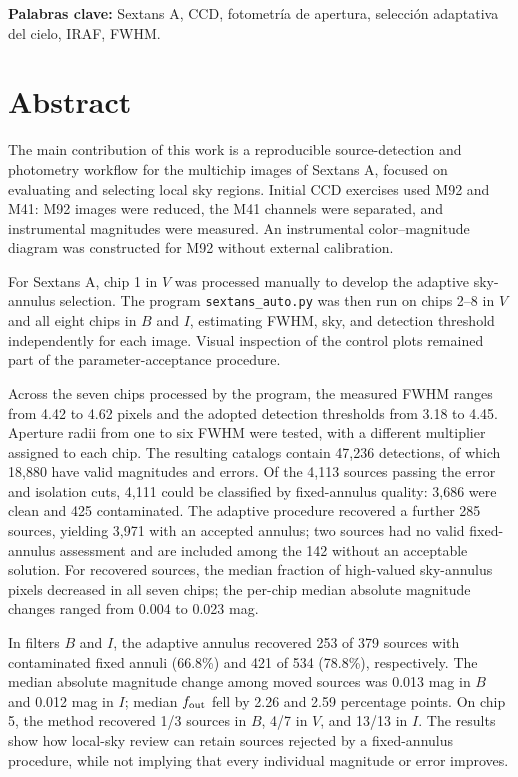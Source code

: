 \documentclass[12pt,letterpaper,oneside]{book}
\begin{document}
\noindent
\textbf{Palabras clave:}
Sextans A, CCD, fotometría de apertura, selección adaptativa del cielo, IRAF, FWHM.



\chapter*{Abstract}

The main contribution of this work is a reproducible source-detection and photometry workflow for the multichip images of Sextans A, focused on evaluating and selecting local sky regions. Initial CCD exercises used M92 and M41: M92 images were reduced, the M41 channels were separated, and instrumental magnitudes were measured. An instrumental color--magnitude diagram was constructed for M92 without external calibration.

For Sextans A, chip 1 in $V$ was processed manually to develop the adaptive sky-annulus selection. The program \texttt{sextans\_auto.py} was then run on chips 2--8 in $V$ and all eight chips in $B$ and $I$, estimating FWHM, sky, and detection threshold independently for each image. Visual inspection of the control plots remained part of the parameter-acceptance procedure.

Across the seven chips processed by the program, the measured FWHM ranges from 4.42 to 4.62 pixels and the adopted detection thresholds from 3.18 to 4.45. Aperture radii from one to six FWHM were tested, with a different multiplier assigned to each chip. The resulting catalogs contain 47,236 detections, of which 18,880 have valid magnitudes and errors. Of the 4,113 sources passing the error and isolation cuts, 4,111 could be classified by fixed-annulus quality: 3,686 were clean and 425 contaminated. The adaptive procedure recovered a further 285 sources, yielding 3,971 with an accepted annulus; two sources had no valid fixed-annulus assessment and are included among the 142 without an acceptable solution. For recovered sources, the median fraction of high-valued sky-annulus pixels decreased in all seven chips; the per-chip median absolute magnitude changes ranged from 0.004 to 0.023 mag.

In filters $B$ and $I$, the adaptive annulus recovered 253 of 379 sources with contaminated fixed annuli (66.8\%) and 421 of 534 (78.8\%), respectively. The median absolute magnitude change among moved sources was 0.013 mag in $B$ and 0.012 mag in $I$; median $f_{\rm out}$ fell by 2.26 and 2.59 percentage points. On chip 5, the method recovered 1/3 sources in $B$, 4/7 in $V$, and 13/13 in $I$. The results show how local-sky review can retain sources rejected by a fixed-annulus procedure, while not implying that every individual magnitude or error improves.
\end{document}
